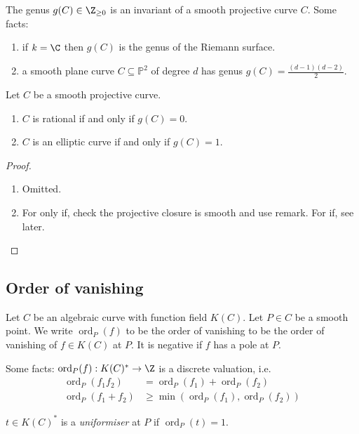 \documentclass[a4paper]{article}
\theoremstyle{definition}
\renewcommand*{\P}{\mathbb{P}}
\DeclareMathOperator{\ord}{ord}
\begin{document}
\begin{remark}
  The genus \(g(C) \in \Z_{\geq 0}\) is an invariant of a smooth projective curve \(C\). Some facts:
  \begin{enumerate}
  \item if \(k = \C\) then \(g(C)\) is the genus of the Riemann surface.
  \item a smooth plane curve \(C \subseteq \P^2\) of degree \(d\) has genus \(g(C) = \frac{(d - 1)(d - 2)}{2}\).
  \end{enumerate}
\end{remark}

\begin{proposition}
  Let \(C\) be a smooth projective curve.
  \begin{enumerate}
  \item \(C\) is rational if and only if \(g(C) = 0\).
  \item \(C\) is an elliptic curve if and only if \(g(C) = 1\).
  \end{enumerate}
\end{proposition}

\begin{proof}\leavevmode
  \begin{enumerate}
  \item Omitted.
  \item For only if, check the projective closure is smooth and use remark. For if, see later.
  \end{enumerate}
\end{proof}

\subsection{Order of vanishing}

Let \(C\) be an algebraic curve with function field \(K(C)\). Let \(P \in C\) be a smooth point. We write \(\ord_P(f)\) to be the order of vanishing to be the order of vanishing of \(f \in K(C)\) at \(P\). It is negative if \(f\) has a pole at \(P\).

Some facts: \(\ord_P(f): K(C)^* \to \Z\) is a discrete valuation, i.e.
\begin{align*}
  \ord_P(f_1f_2) &= \ord_P(f_1) + \ord_P(f_2) \\
  \ord_P(f_1 + f_2) & \geq \min(\ord_P(f_1), \ord_P(f_2))
\end{align*}

\begin{definition}[uniformiser]
  \(t \in K(C)^*\) is a \emph{uniformiser} at \(P\) if \(\ord_P(t) = 1\).
\end{definition}
\end{document}

